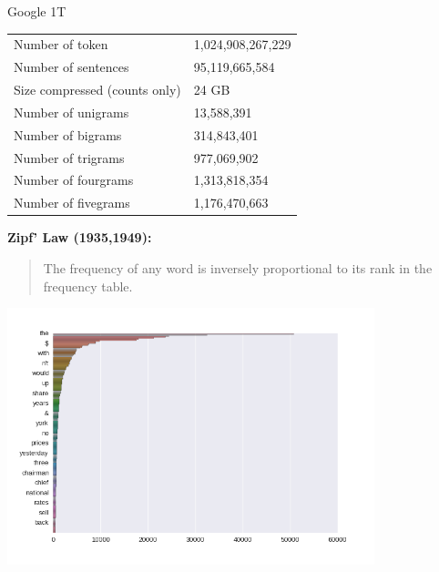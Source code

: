 \documentclass{beamer}
\begin{document}
\begin{frame}
  \begin{center}
    \alert{Google 1T}

  \end{center}
  \begin{table}
    \centering
  \begin{tabular}{ll}
    \toprule
    Number of token  &1,024,908,267,229 \\
    Number of sentences & 95,119,665,584 \\
    Size compressed (counts only) & 24 GB \\  
    \midrule
    Number of unigrams & 13,588,391 \\
    Number of bigrams & 314,843,401 \\ 
    Number of trigrams & 977,069,902 \\ 
    Number of fourgrams & 1,313,818,354 \\
    Number of fivegrams&  1,176,470,663 \\
    \bottomrule
  \end{tabular}
  \end{table}


\end{frame}

\begin{frame}
  \textbf{Zipf' Law (1935,1949):}
  \begin{quote}
    The frequency of any word is inversely proportional to its rank in the frequency table.
  \end{quote}


     \begin{center}
       \includegraphics[width=0.8\textwidth]{zipf}         
     \end{center}
\end{frame}
\end{document}
